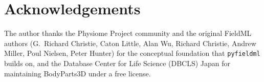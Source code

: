 \documentclass[preprint,12pt,a4paper]{elsarticle}
\begin{document}
\section*{Acknowledgements}

The author thanks the Physiome Project community and the original FieldML authors (G.~Richard Christie, Caton Little, Alan Wu, Richard Christie, Andrew Miller, Poul Nielsen, Peter Hunter) for the conceptual foundation that \texttt{pyfieldml} builds on, and the Database Center for Life Science (DBCLS) Japan for maintaining BodyParts3D under a free license.



\end{document}
